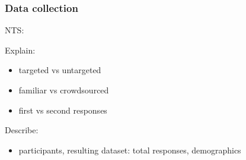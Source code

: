 \documentclass[handout,xcolor={dvipsnames}]{beamer}
\begin{document}
%

\begin{frame}
\frametitle{Data collection}

NTS:

Explain:
\begin{itemize}
\item{targeted vs untargeted}
\item{familiar vs crowdsourced}
\item{first vs second responses}
\end{itemize}
Describe:
\begin{itemize}
\item{participants, resulting dataset: total responses, demographics}
\end{itemize}
\end{frame}
\end{document}
